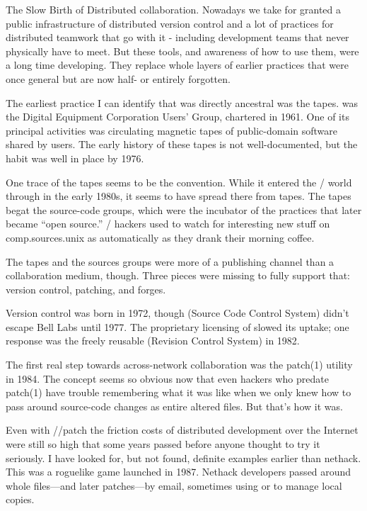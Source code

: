 \sect The Slow Birth of Distributed collaboration.
Nowadays we take for granted a public infrastructure of distributed version
control and a lot of practices for distributed teamwork that go with it -
including development teams that never physically have to meet. But these
tools, and awareness of how to use them, were a long time developing. They
replace whole layers of earlier practices that were once general but are now
half- or entirely forgotten.

The earliest practice I can identify that was directly ancestral was the 
tapes.  was the Digital Equipment Corporation Users' Group, chartered in
1961. One of its principal activities was circulating magnetic tapes of
public-domain software shared by  users. The early history of these tapes is
not well-documented, but the habit was well in place by 1976.

One trace of the  tapes seems to be the  convention. While it
entered the \UNIX/ world through  in the early 1980s, it seems to have
spread there from  tapes. The  tapes begat the  source-code
groups, which were the incubator of the practices that later became ``open
source.'' \UNIX/ hackers used to watch for interesting new stuff on
comp.sources.unix as automatically as they drank their morning coffee.

The  tapes and the  sources groups were more of a publishing channel
than a collaboration medium, though. Three pieces were missing to fully support
that: version control, patching, and forges.

Version control was born in 1972, though  (Source Code Control System)
didn't escape Bell Labs until 1977. The proprietary licensing of  slowed
its uptake; one response was the freely reusable  (Revision Control System)
in 1982.

The first real step towards across-network collaboration was the patch(1)
utility in 1984. The concept seems so obvious now that even hackers who predate
patch(1) have trouble remembering what it was like when we only knew how to
pass around source-code changes as entire altered files. But that's how it was.

Even with //patch the friction costs of distributed development over the
Internet were still so high that some years passed before anyone thought to try
it seriously. I have looked for, but not found, definite examples earlier than
nethack. This was a roguelike game launched in 1987. Nethack developers passed
around whole files---and later patches---by email, sometimes using  or 
to manage local copies.

